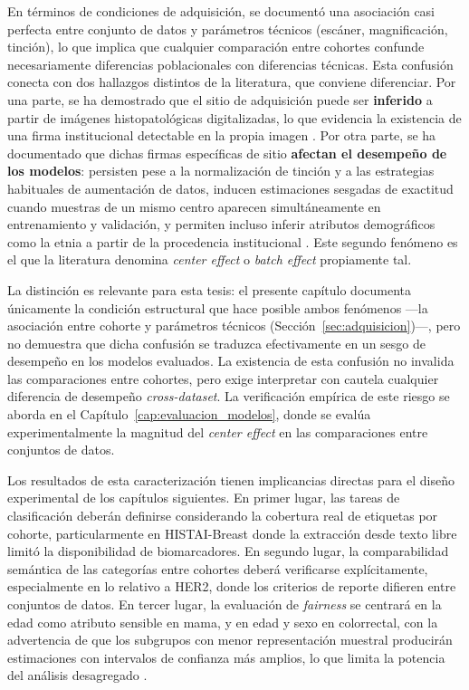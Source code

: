 En términos de condiciones de adquisición, se documentó una asociación casi perfecta entre conjunto de datos y parámetros técnicos (escáner, magnificación, tinción), lo que implica que cualquier comparación entre cohortes confunde necesariamente diferencias poblacionales con diferencias técnicas. Esta confusión conecta con dos hallazgos distintos de la literatura, que conviene diferenciar. Por una parte, se ha demostrado que el sitio de adquisición puede ser \textbf{inferido} a partir de imágenes histopatológicas digitalizadas, lo que evidencia la existencia de una firma institucional detectable en la propia imagen \parencite{alsaafin2023biased}. Por otra parte, se ha documentado que dichas firmas específicas de sitio \textbf{afectan el desempeño de los modelos}: persisten pese a la normalización de tinción y a las estrategias habituales de aumentación de datos, inducen estimaciones sesgadas de exactitud cuando muestras de un mismo centro aparecen simultáneamente en entrenamiento y validación, y permiten incluso inferir atributos demográficos como la etnia a partir de la procedencia institucional \parencite{howard2021site}. Este segundo fenómeno es el que la literatura denomina \textit{center effect} o \textit{batch effect} propiamente tal.

La distinción es relevante para esta tesis: el presente capítulo documenta únicamente la condición estructural que hace posible ambos fenómenos —la asociación entre cohorte y parámetros técnicos (Sección~\ref{sec:adquisicion})—, pero no demuestra que dicha confusión se traduzca efectivamente en un sesgo de desempeño en los modelos evaluados. La existencia de esta confusión no invalida las comparaciones entre cohortes, pero exige interpretar con cautela cualquier diferencia de desempeño \textit{cross-dataset}. La verificación empírica de este riesgo se aborda en el Capítulo~\ref{cap:evaluacion_modelos}, donde se evalúa experimentalmente la magnitud del \textit{center effect} en las comparaciones entre conjuntos de datos.

Los resultados de esta caracterización tienen implicancias directas para el diseño experimental de los capítulos siguientes. En primer lugar, las tareas de clasificación deberán definirse considerando la cobertura real de etiquetas por cohorte, particularmente en HISTAI-Breast donde la extracción desde texto libre limitó la disponibilidad de biomarcadores. En segundo lugar, la comparabilidad semántica de las categorías entre cohortes deberá verificarse explícitamente, especialmente en lo relativo a HER2, donde los criterios de reporte difieren entre conjuntos de datos. En tercer lugar, la evaluación de \textit{fairness} se centrará en la edad como atributo sensible en mama, y en edad y sexo en colorrectal, con la advertencia de que los subgrupos con menor representación muestral producirán estimaciones con intervalos de confianza más amplios, lo que limita la potencia del análisis desagregado \parencite{riccilara2022fairness}.


